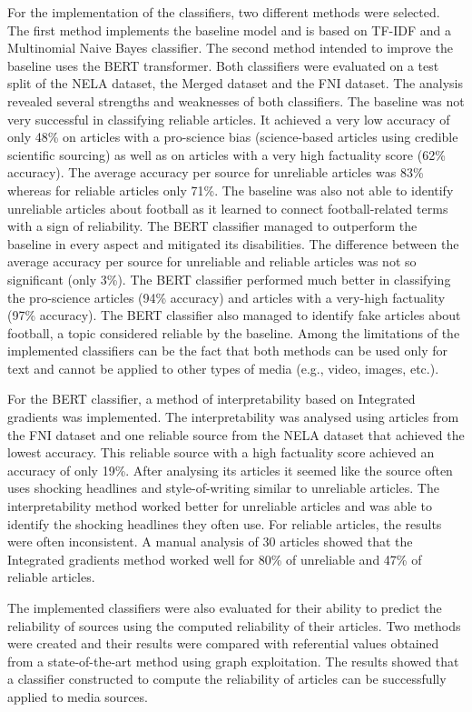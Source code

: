 For the implementation of the classifiers, two different methods were selected. The first method implements the baseline model and is based on TF-IDF and a Multinomial Naive Bayes classifier. The second method intended to improve the baseline uses the BERT transformer. 
Both classifiers were evaluated on a test split of the NELA dataset, the Merged dataset and the FNI dataset. The analysis revealed several strengths and weaknesses of both classifiers. The baseline was not very successful in classifying reliable articles. It achieved a very low accuracy of only 48\% on articles with a pro-science bias (science-based articles using credible scientific sourcing) as well as on articles with a very high factuality score (62\% accuracy). The average accuracy per source for unreliable articles was 83\% whereas for reliable articles only 71\%. The baseline was also not able to identify unreliable articles about football as it learned to connect football-related terms with a sign of reliability.
The BERT classifier managed to outperform the baseline in every aspect and mitigated its disabilities. The difference between the average accuracy per source for unreliable and reliable articles was not so significant (only 3\%). The BERT classifier performed much better in classifying the pro-science articles (94\% accuracy) and articles with a very-high factuality (97\% accuracy). The BERT classifier also managed to identify fake articles about football, a topic considered reliable by the baseline. Among the limitations of the implemented classifiers can be the fact that both methods can be used only for text and cannot be applied to other types of media (e.g., video, images, etc.).

For the BERT classifier, a method of interpretability based on Integrated gradients was implemented. The interpretability was analysed using articles from the FNI dataset and one reliable source from the NELA dataset that achieved the lowest accuracy. This reliable source with a high factuality score achieved an accuracy of only 19\%. After analysing its articles it seemed like the source often uses shocking headlines and style-of-writing similar to unreliable articles. The interpretability method worked better for unreliable articles and was able to identify the shocking headlines they often use. For reliable articles, the results were often inconsistent. A manual analysis of 30 articles showed that the Integrated gradients method worked well for 80\% of unreliable and 47\% of reliable articles.

The implemented classifiers were also evaluated for their ability to predict the reliability of sources using the computed reliability of their articles. Two methods were created and their results were compared with referential values obtained from a state-of-the-art method using graph exploitation. The results showed that a classifier constructed to compute the reliability of articles can be successfully applied to media sources. 

